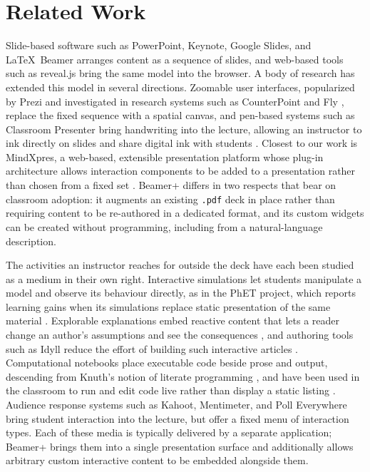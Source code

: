 \documentclass[sigconf]{acmart}
\begin{document}
\section{Related Work}
\label{sec:related}
Slide-based software such as PowerPoint, Keynote, Google Slides, and \LaTeX\ Beamer arranges content as a sequence of slides, and web-based tools such as reveal.js bring the same model into the browser. A body of research has extended this model in several directions. Zoomable user interfaces, popularized by Prezi and investigated in research systems such as CounterPoint \cite{good2002zoomable} and Fly \cite{lichtschlag2009fly}, replace the fixed sequence with a spatial canvas, and pen-based systems such as Classroom Presenter bring handwriting into the lecture, allowing an instructor to ink directly on slides and share digital ink with students \cite{anderson2007classroom}. Closest to our work is MindXpres, a web-based, extensible presentation platform whose plug-in architecture allows interaction components to be added to a presentation rather than chosen from a fixed set \cite{roels2014mindxpres}. Beamer+ differs in two respects that bear on classroom adoption: it augments an existing \texttt{.pdf} deck in place rather than requiring content to be re-authored in a dedicated format, and its custom widgets can be created without programming, including from a natural-language description.

The activities an instructor reaches for outside the deck have each been studied as a medium in their own right. Interactive simulations let students manipulate a model and observe its behaviour directly, as in the PhET project, which reports learning gains when its simulations replace static presentation of the same material \cite{wieman2008phet}. Explorable explanations embed reactive content that lets a reader change an author's assumptions and see the consequences \cite{victor2011explorable}, and authoring tools such as Idyll reduce the effort of building such interactive articles \cite{conlen2018idyll}. Computational notebooks place executable code beside prose and output, descending from Knuth's notion of literate programming \cite{knuth1984literate}, and have been used in the classroom to run and edit code live rather than display a static listing \cite{johnson2020jupyter}. Audience response systems such as Kahoot, Mentimeter, and Poll Everywhere bring student interaction into the lecture, but offer a fixed menu of interaction types. Each of these media is typically delivered by a separate application; Beamer+ brings them into a single presentation surface and additionally allows arbitrary custom interactive content to be embedded alongside them.
\end{document}
